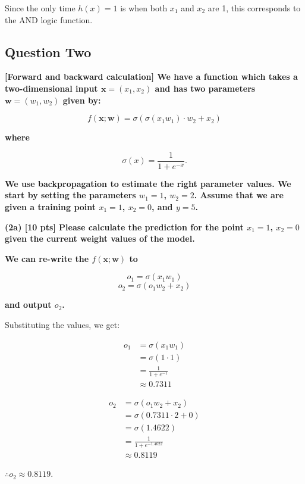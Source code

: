   Since the only time $h(x)=1$ is when both $x_1$ and $x_2$ are 1, this corresponds to the AND logic function.

\subsection{Question Two}

\textbf{[Forward and backward calculation] We have a function which takes a two-dimensional input $\mathbf{x} = (x_1, x_2)$ and has two parameters $\mathbf{w} = (w_1, w_2)$ given by:}

$$
f(\mathbf{x}; \mathbf{w}) = \sigma(\sigma(x_1 w_1) \cdot w_2 + x_2)
$$

\textbf{where}

$$
\sigma(x) = \frac{1}{1 + e^{-x}}.
$$

\textbf{We use backpropagation to estimate the right parameter values. We start by setting the parameters $w_1 = 1$, $w_2 = 2$. Assume that we are given a training point $x_1 = 1$, $x_2 = 0$, and $y = 5$.}

\textbf{(2a) [10 pts] Please calculate the prediction for the point $x_1 = 1$, $x_2 = 0$ given the current weight values of the model.}

\textbf{We can re-write the $f(\mathbf{x}; \mathbf{w})$ to}

$$
o_1 = \sigma(x_1 w_1)
$$
$$
o_2 = \sigma(o_1 w_2 + x_2)
$$

\textbf{and output $o_2$.}

Substituting the values, we get:

\begin{align}
  o_1 &= \sigma(x_1 w_1) \nonumber \\
      &= \sigma(1 \cdot 1) \nonumber \\
      &= \frac{1}{1 + e^{-1}} \nonumber \\
      &\approx 0.7311
\end{align}

\begin{align}
  o_2 &= \sigma(o_1 w_2 + x_2) \nonumber \\
      &= \sigma(0.7311 \cdot 2 + 0) \nonumber \\
      &= \sigma(1.4622) \nonumber \\
      &= \frac{1}{1 + e^{-1.4622}} \nonumber \\
      &\approx 0.8119
\end{align}

$\therefore o_2 \approx 0.8119$. 


